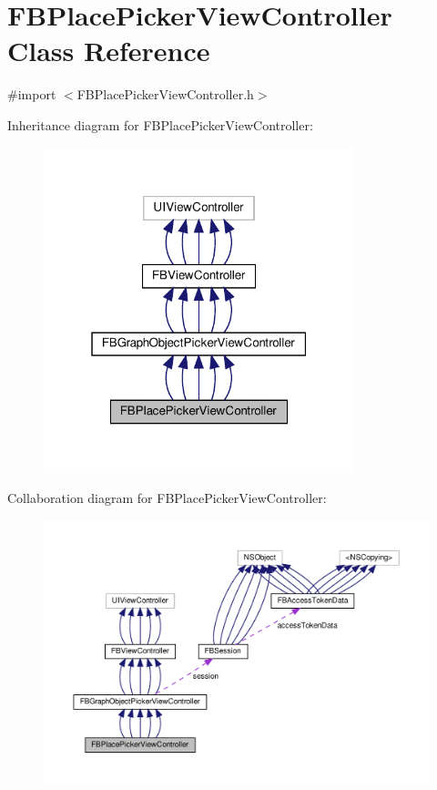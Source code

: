 \hypertarget{interfaceFBPlacePickerViewController}{}\section{F\+B\+Place\+Picker\+View\+Controller Class Reference}
\label{interfaceFBPlacePickerViewController}


{\ttfamily \#import $<$F\+B\+Place\+Picker\+View\+Controller.\+h$>$}



Inheritance diagram for F\+B\+Place\+Picker\+View\+Controller\+:
\nopagebreak
\begin{figure}[H]
\begin{center}
\leavevmode
\includegraphics[width=256pt]{interfaceFBPlacePickerViewController__inherit__graph}
\end{center}
\end{figure}


Collaboration diagram for F\+B\+Place\+Picker\+View\+Controller\+:
\nopagebreak
\begin{figure}[H]
\begin{center}
\leavevmode
\includegraphics[width=350pt]{interfaceFBPlacePickerViewController__coll__graph}
\end{center}
\end{figure}
